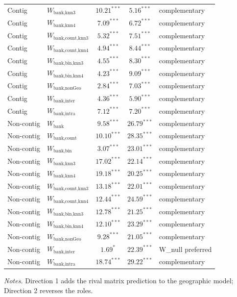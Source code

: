 \begin{table}[htbp]
\begin{tabular}{llccl}
    Contig & $W_{\text{bank,knn3}}$ & $10.21^{***}$ & $5.16^{***}$ & complementary \\
    Contig & $W_{\text{bank,knn4}}$ & $7.09^{***}$ & $6.72^{***}$ & complementary \\
    Contig & $W_{\text{bank,count,knn3}}$ & $5.32^{***}$ & $7.51^{***}$ & complementary \\
    Contig & $W_{\text{bank,count,knn4}}$ & $4.94^{***}$ & $8.44^{***}$ & complementary \\
    Contig & $W_{\text{bank,bin,knn3}}$ & $4.55^{***}$ & $8.30^{***}$ & complementary \\
    Contig & $W_{\text{bank,bin,knn4}}$ & $4.23^{***}$ & $9.09^{***}$ & complementary \\
    Contig & $W_{\text{bank,nonGeo}}$ & $2.84^{***}$ & $7.03^{***}$ & complementary \\
    Contig & $W_{\text{bank,inter}}$ & $4.36^{***}$ & $5.90^{***}$ & complementary \\
    Contig & $W_{\text{bank,intra}}$ & $7.12^{***}$ & $7.20^{***}$ & complementary \\
    \addlinespace
    Non-contig & $W_{\text{bank}}$ & $9.58^{***}$ & $26.79^{***}$ & complementary \\
    Non-contig & $W_{\text{bank,count}}$ & $10.10^{***}$ & $28.35^{***}$ & complementary \\
    Non-contig & $W_{\text{bank,bin}}$ & $3.07^{***}$ & $23.01^{***}$ & complementary \\
    Non-contig & $W_{\text{bank,knn3}}$ & $17.02^{***}$ & $22.14^{***}$ & complementary \\
    Non-contig & $W_{\text{bank,knn4}}$ & $19.18^{***}$ & $20.25^{***}$ & complementary \\
    Non-contig & $W_{\text{bank,count,knn3}}$ & $13.18^{***}$ & $22.01^{***}$ & complementary \\
    Non-contig & $W_{\text{bank,count,knn4}}$ & $12.44^{***}$ & $24.59^{***}$ & complementary \\
    Non-contig & $W_{\text{bank,bin,knn3}}$ & $12.78^{***}$ & $21.25^{***}$ & complementary \\
    Non-contig & $W_{\text{bank,bin,knn4}}$ & $12.10^{***}$ & $23.29^{***}$ & complementary \\
    Non-contig & $W_{\text{bank,nonGeo}}$ & $9.28^{***}$ & $21.05^{***}$ & complementary \\
    Non-contig & $W_{\text{bank,inter}}$ & $1.69^{*}$ & $22.39^{***}$ & W\_null preferred \\
    Non-contig & $W_{\text{bank,intra}}$ & $18.74^{***}$ & $29.22^{***}$ & complementary \\
    \bottomrule
  \end{tabular}
  \begin{tablenotes}\footnotesize
  \item \emph{Notes.} Direction 1 adds the rival matrix prediction to the geographic model; Direction 2 reverses the roles.
  \end{tablenotes}
\end{table}

